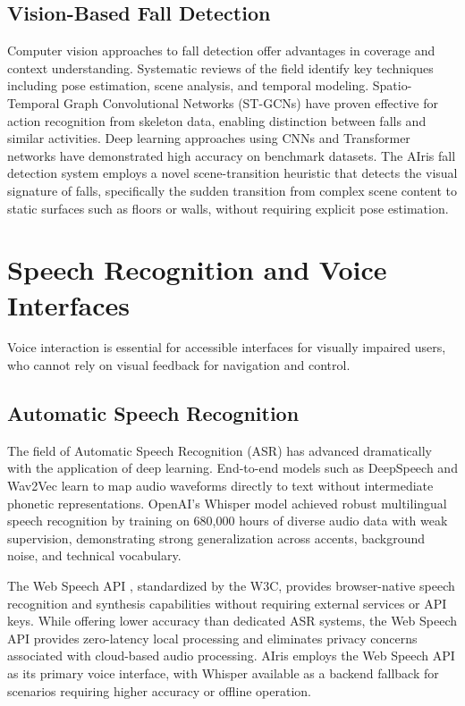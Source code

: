 \documentclass[12pt,a4paper]{report}
\begin{document}
\subsection{Vision-Based Fall Detection}

Computer vision approaches to fall detection offer advantages in coverage and context understanding. Systematic reviews of the field \cite{fallreview1, fallreview2} identify key techniques including pose estimation, scene analysis, and temporal modeling. Spatio-Temporal Graph Convolutional Networks (ST-GCNs) \cite{stgcn} have proven effective for action recognition from skeleton data, enabling distinction between falls and similar activities. Deep learning approaches using CNNs \cite{fallcnn} and Transformer networks \cite{falltrans} have demonstrated high accuracy on benchmark datasets. The AIris fall detection system employs a novel scene-transition heuristic that detects the visual signature of falls, specifically the sudden transition from complex scene content to static surfaces such as floors or walls, without requiring explicit pose estimation.

\section{Speech Recognition and Voice Interfaces}

Voice interaction is essential for accessible interfaces for visually impaired users, who cannot rely on visual feedback for navigation and control.

\subsection{Automatic Speech Recognition}

The field of Automatic Speech Recognition (ASR) has advanced dramatically with the application of deep learning. End-to-end models such as DeepSpeech \cite{deepspeech} and Wav2Vec \cite{wav2vec} learn to map audio waveforms directly to text without intermediate phonetic representations. OpenAI's Whisper model \cite{whisper} achieved robust multilingual speech recognition by training on 680,000 hours of diverse audio data with weak supervision, demonstrating strong generalization across accents, background noise, and technical vocabulary.

The Web Speech API \cite{webspeech}, standardized by the W3C, provides browser-native speech recognition and synthesis capabilities without requiring external services or API keys. While offering lower accuracy than dedicated ASR systems, the Web Speech API provides zero-latency local processing and eliminates privacy concerns associated with cloud-based audio processing. AIris employs the Web Speech API as its primary voice interface, with Whisper available as a backend fallback for scenarios requiring higher accuracy or offline operation.
\end{document}
